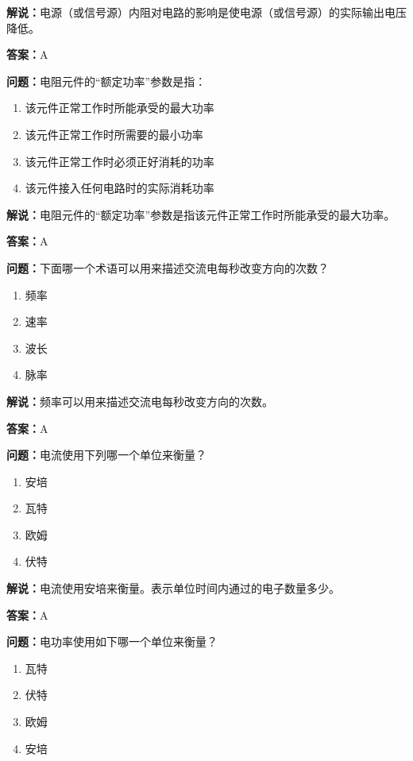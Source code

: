 \textbf{解说：}电源（或信号源）内阻对电路的影响是使电源（或信号源）的实际输出电压降低。

\textbf{答案：}A

\textbf{问题：}电阻元件的“额定功率”参数是指：

\begin{enumerate}[label=\Alph*), leftmargin=3em]
	\item 该元件正常工作时所能承受的最大功率
	\item 该元件正常工作时所需要的最小功率
	\item 该元件正常工作时必须正好消耗的功率
	\item 该元件接入任何电路时的实际消耗功率
\end{enumerate}

\textbf{解说：}电阻元件的“额定功率”参数是指该元件正常工作时所能承受的最大功率。

\textbf{答案：}A

\textbf{问题：}下面哪一个术语可以用来描述交流电每秒改变方向的次数？

\begin{enumerate}[label=\Alph*), leftmargin=3em]
	\item 频率
	\item 速率
	\item 波长
	\item 脉率
\end{enumerate}

\textbf{解说：}频率可以用来描述交流电每秒改变方向的次数。

\textbf{答案：}A

\textbf{问题：}电流使用下列哪一个单位来衡量？

\begin{enumerate}[label=\Alph*), leftmargin=3em]
	\item 安培
	\item 瓦特
	\item 欧姆
	\item 伏特
\end{enumerate}

\textbf{解说：}电流使用安培来衡量。表示单位时间内通过的电子数量多少。%

\textbf{答案：}A

\textbf{问题：}电功率使用如下哪一个单位来衡量？

\begin{enumerate}[label=\Alph*), leftmargin=3em]
	\item 瓦特
	\item 伏特
	\item 欧姆
	\item 安培
\end{enumerate}

